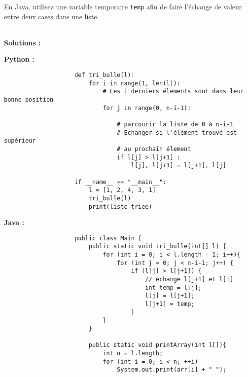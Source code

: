 \begin{Exercice} [10 minutes]
    \begin{conseil}
    En Java, utilisez une variable temporaire \lstinline{temp} afin de faire l'échange de valeur entre deux cases dans une liste.
    \end{conseil}
    
    \ \\
    
    \textbf{Solutions :}
    \item \textbf{Python :}
                \begin{verbatim}
                    def tri_bulle(l):
                        for i in range(1, len(l)):
                            # Les i derniers élements sont dans leur bonne position 
                            for j in range(0, n-i-1): 
                      
                                # parcourir la liste de 0 à n-i-1 
                                # Echanger si l'élément trouvé est supérieur 
                                # au prochain élement
                                if l[j] > l[j+1] : 
                                    l[j], l[j+1] = l[j+1], l[j] 
                    
                    if __name__ == "__main__":
                        l = [1, 2, 4, 3, 1]
                        tri_bulle(l)
                        print(liste_triee)
                \end{verbatim}
        \item \textbf{Java :}
                \begin{verbatim}
                    public class Main {
                        public static void tri_bulle(int[] l) {
                            for (int i = 0; i < l.length - 1; i++){
                                for (int j = 0; j < n-i-1; j++) {
                                    if (l[j] > l[j+1]) { 
                                        // échange l[j+1] et l[i] 
                                        int temp = l[j]; 
                                        l[j] = l[j+1]; 
                                        l[j+1] = temp; 
                                    } 
                            }
                        }
                        
                        public static void printArray(int l[]){ 
                            int n = l.length; 
                            for (int i = 0; i < n; ++i) 
                                System.out.print(arr[i] + " "); 
                      

\end{verbatim}
\end{Exercice}
